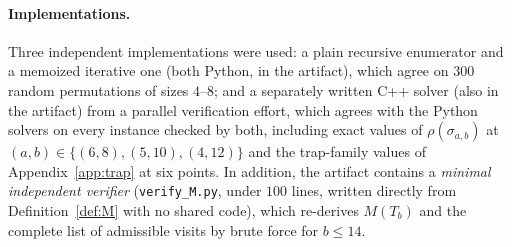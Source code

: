 \documentclass[11pt]{article}
\theoremstyle{definition}
\begin{document}
\paragraph{Implementations.} Three independent implementations were used: a plain
recursive enumerator and a memoized iterative one (both Python, in the artifact),
which agree on $300$ random permutations of sizes $4$--$8$; and a separately
written C++ solver (also in the artifact) from a parallel verification effort,
which agrees with the Python solvers on every instance checked by both, including
exact values of $\rho(\sigma_{a,b})$ at $(a,b) \in \{(6,8), (5,10), (4,12)\}$ and
the trap-family values of Appendix~\ref{app:trap} at six points. In addition, the
artifact contains a \emph{minimal independent verifier}
(\texttt{verify\_M.py}, under $100$ lines, written directly from
Definition~\ref{def:M} with no shared code), which re-derives $M(T_b)$ and the
complete list of admissible visits by brute force for $b \le 14$.
\end{document}
